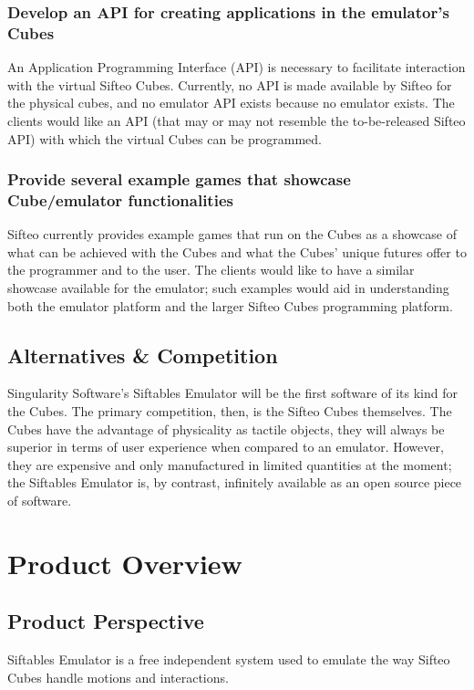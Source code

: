 \documentclass[12pt]{article}
\begin{document}
                          \subsubsection{Develop an API for creating applications in the emulator’s Cubes}
                          An Application Programming Interface (API) is necessary to facilitate interaction with the virtual Sifteo Cubes. Currently, no API is made available by Sifteo for the physical cubes, and no emulator API exists because no emulator exists. The clients would like an API (that may or may not resemble the to-be-released Sifteo API) with which the virtual Cubes can be programmed.

                          \subsubsection{Provide several example games that showcase Cube/emulator functionalities}
                          Sifteo currently provides example games that run on the Cubes as a showcase of what can be achieved with the Cubes and what the Cubes’ unique futures offer to the programmer and to the user. The clients would like to have a similar showcase available for the emulator; such examples would aid in understanding both the emulator platform and the larger Sifteo Cubes programming platform.

              \subsection{Alternatives \& Competition}
              Singularity Software's Siftables Emulator will be the first software of its kind for the Cubes. The primary competition, then, is the Sifteo Cubes themselves. The Cubes have the advantage of physicality \- as tactile objects, they will always be superior in terms of user experience when compared to an emulator. However, they are expensive and only manufactured in limited quantities at the moment; the Siftables Emulator is, by contrast, infinitely available as an open source piece of software.

\section{Product Overview}

              \subsection{Product Perspective}
              Siftables Emulator is a free independent system used to emulate the way Sifteo Cubes handle motions and interactions.
\end{document}
